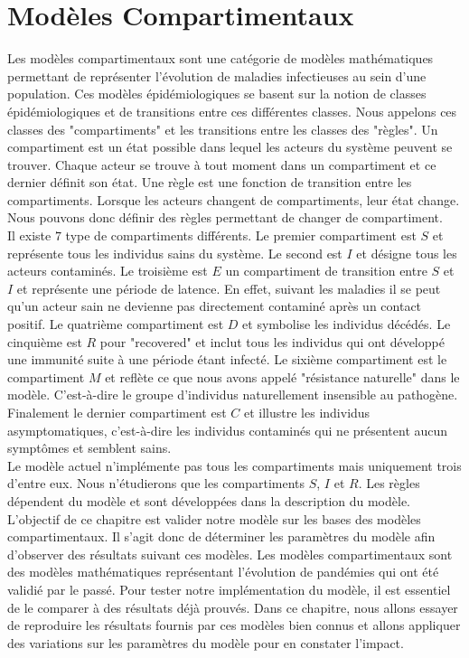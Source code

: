 \chapter{Modèles Compartimentaux} \label{ch:intro}

Les modèles compartimentaux sont une catégorie de modèles mathématiques permettant de représenter l'évolution de maladies infectieuses au sein d'une population. Ces modèles épidémiologiques se basent sur la notion de classes épidémiologiques et de transitions entre ces différentes classes. Nous appelons ces classes des "compartiments" et les transitions entre les classes des "règles". Un compartiment est un état possible dans lequel les acteurs du système peuvent se trouver. Chaque acteur se trouve à tout moment dans un compartiment et ce dernier définit son état. Une règle est une fonction de transition entre les compartiments. Lorsque les acteurs changent de compartiments, leur état change. Nous pouvons donc définir des règles permettant de changer de compartiment.\\

Il existe $7$ type de compartiments différents. Le premier compartiment est $S$ et représente tous les individus sains du système. Le second est $I$ et désigne tous les acteurs contaminés. Le troisième est $E$ un compartiment de transition entre $S$ et $I$ et représente une période de latence. En effet, suivant les maladies il se peut qu'un acteur sain ne devienne pas directement contaminé après un contact positif. Le quatrième compartiment est $D$ et symbolise les individus décédés. Le cinquième est $R$ pour "recovered" et inclut tous les individus qui ont développé une immunité suite à une période étant infecté. Le sixième compartiment est le compartiment $M$ et reflète ce que nous avons appelé "résistance naturelle" dans le modèle. C'est-à-dire le groupe d'individus naturellement insensible au pathogène. Finalement le dernier compartiment est $C$ et illustre les individus asymptomatiques, c'est-à-dire les individus contaminés qui ne présentent aucun symptômes et semblent sains.\\

Le modèle actuel n'implémente pas tous les compartiments mais uniquement trois d'entre eux. Nous n'étudierons que les compartiments $S$, $I$ et $R$. Les règles dépendent du modèle et sont développées dans la description du modèle.\\

L'objectif de ce chapitre est valider notre modèle sur les bases des modèles compartimentaux. Il s'agit donc de déterminer les paramètres du modèle afin d'observer des résultats suivant ces modèles. Les modèles compartimentaux sont des modèles mathématiques représentant l'évolution de pandémies qui ont été validié par le passé. Pour tester notre implémentation du modèle, il est essentiel de le comparer à des résultats déjà prouvés. Dans ce chapitre, nous allons essayer de reproduire les résultats fournis par ces modèles bien connus et allons appliquer des variations sur les paramètres du modèle pour en constater l'impact.

